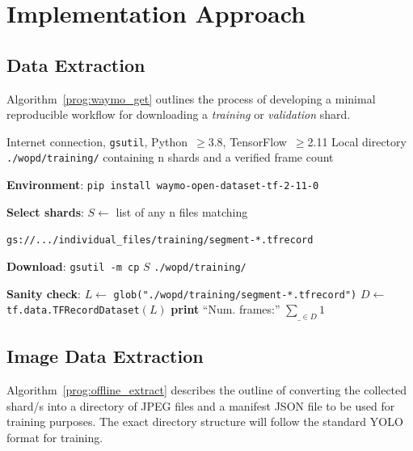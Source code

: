 \section{Implementation Approach}

\subsection{Data Extraction}
Algorithm~\ref{prog:waymo_get} outlines the process of developing a minimal reproducible workflow for downloading a \emph{training} or \emph{validation} shard.

\begin{algorithm}[H]
\caption{Minimal Workflow to Acquire and Inspect a Waymo Open Perception Shard}
  \label{prog:waymo_get}
  \begin{algorithmic}[1]
  \Require Internet connection, \texttt{gsutil}, Python~$\geq$3.8, TensorFlow~$\geq$2.11
  \Ensure Local directory \texttt{./wopd/training/} containing n shards and a verified frame count

  \State \textbf{Environment}:
  \State \quad \texttt{pip install waymo-open-dataset-tf-2-11-0} 

  \State \textbf{Select shards}:
  \State \quad $S \gets$ list of any n files matching 

  \texttt{gs://.../individual\_files/training/segment-*.tfrecord}

  \State \textbf{Download}:
  \State \quad \texttt{gsutil -m cp} $S$ \texttt{./wopd/training/}

  \State \textbf{Sanity check}:
  \State \quad $L \gets$ \texttt{glob("./wopd/training/segment-*.tfrecord")}
  \State \quad $D \gets$ \texttt{tf.data.TFRecordDataset}$(L)$
  \State \quad \textbf{print} ``Num. frames:'' $\sum_{\_ \in D} 1$
  \end{algorithmic}
\end{algorithm}

\subsection{Image Data Extraction}

Algorithm~\ref{prog:offline_extract} describes the outline of converting the collected shard/s into a directory of JPEG files and a manifest JSON file to be used for training purposes. The exact directory structure will follow the standard YOLO format for training.

